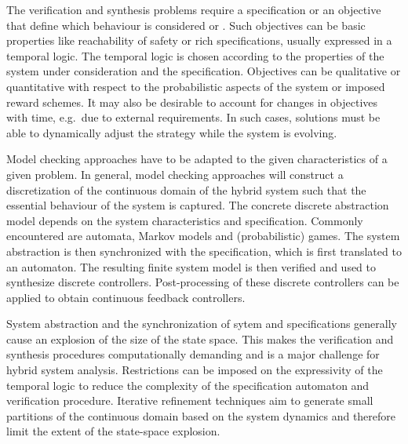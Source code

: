 The verification and synthesis problems require a specification or an objective that define which behaviour is considered  or .
Such objectives can be basic properties like reachability of safety or rich specifications, usually expressed in a temporal logic.
The temporal logic is chosen according to the properties of the system under consideration and the specification.
Objectives can be qualitative or quantitative with respect to the probabilistic aspects of the system or imposed reward schemes.
It may also be desirable to account for changes in objectives with time, e.g.\ due to external requirements.
In such cases, solutions must be able to dynamically adjust the strategy while the system is evolving.

Model checking approaches have to be adapted to the given characteristics of a given problem.
In general, model checking approaches will construct a discretization of the continuous domain of the hybrid system such that the essential behaviour of the system is captured.
The concrete discrete abstraction model depends on the system characteristics and specification.
Commonly encountered are automata, Markov models and (probabilistic) games.
The system abstraction is then synchronized with the specification, which is first translated to an automaton.
The resulting finite system model is then verified and used to synthesize discrete controllers.
Post-processing of these discrete controllers can be applied to obtain continuous feedback controllers.

System abstraction and the synchronization of sytem and specifications generally cause an explosion of the size of the state space.
This makes the verification and synthesis procedures computationally demanding and is a major challenge for hybrid system analysis.
Restrictions can be imposed on the expressivity of the temporal logic to reduce the complexity of the specification automaton and verification procedure.
Iterative refinement techniques aim to generate small partitions of the continuous domain based on the system dynamics and therefore limit the extent of the state-space explosion.

